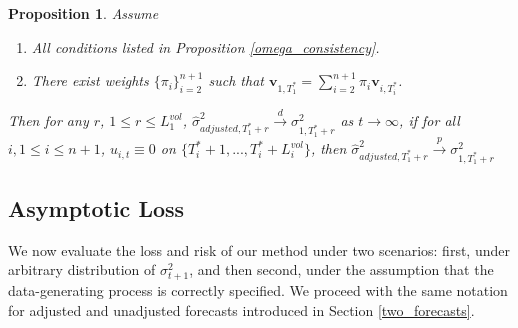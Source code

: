 \documentclass[11pt,3p,review,authoryear]{elsarticle}
\newcommand{\weight}{\pi}
\newtheorem{prop}{Proposition}
\theoremstyle{definition}
\begin{document}
  \begin{prop}\label{sigma_consistency}
    Assume
    \begin{enumerate}
      \item All conditions listed in Proposition \ref{omega_consistency}.
      \item There exist weights $\{\pi_{i}\}_{i=2}^{n+1}$ such that $\textbf{v}_{1,T_{1}^{*}} = \sum^{n+1}_{i=2}\weight_{i} \textbf{v}_{i,T_{i}^{*}}$.
     \end{enumerate}
  Then for any $r$, $1\leq r \leq L_{1}^{vol}$, $\hat\sigma^{2}_{adjusted,T_{1}^{*}+r}\overset{d}{\longrightarrow}\sigma^{2}_{1,T_{1}^{*}+r}$ as $t\rightarrow\infty$, if for all $i, 1 \leq i \leq n+ 1$, $u_{i,t} \equiv 0$ on $\{T^{*}_{i}+1,... ,T^{*}_{i}+L_{i}^{vol}\}$, then $\hat\sigma^{2}_{adjusted,T_{1}^{*}+r}\overset{p}{\longrightarrow}\sigma^{2}_{1,T_{1}^{*}+r}$ 
  \end{prop}

\subsection{Asymptotic Loss}

We now evaluate the loss and risk of our method under two scenarios: first, under arbitrary distribution of $\sigma^{2}_{t+1}$, and then second, under the assumption that the data-generating process is correctly specified.  We proceed with the same notation for adjusted and unadjusted forecasts introduced in Section \ref{two_forecasts}.
\end{document}
